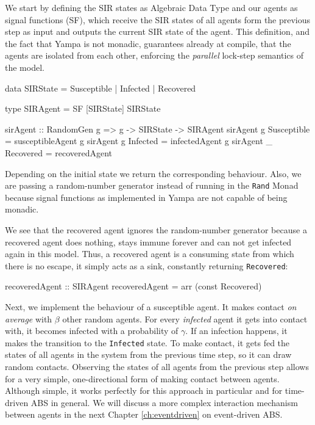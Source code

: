 We start by defining the SIR states as Algebraic Data Type and our agents as signal functions (SF), which receive the SIR states of all agents form the previous step as input and outputs the current SIR state of the agent. This definition, and the fact that Yampa is not monadic, guarantees already at compile, that the agents are isolated from each other, enforcing the \textit{parallel} lock-step semantics of the model.

\begin{HaskellCode}
data SIRState = Susceptible | Infected | Recovered

type SIRAgent = SF [SIRState] SIRState 

sirAgent :: RandomGen g => g -> SIRState -> SIRAgent
sirAgent g Susceptible = susceptibleAgent g
sirAgent g Infected    = infectedAgent g
sirAgent _ Recovered   = recoveredAgent
\end{HaskellCode}

Depending on the initial state we return the corresponding behaviour. Also, we are passing a random-number generator instead of running in the \texttt{Rand} Monad because signal functions as implemented in Yampa are not capable of being monadic. 

We see that the recovered agent ignores the random-number generator because a recovered agent does nothing, stays immune forever and can not get infected again in this model. Thus, a recovered agent is a consuming state from which there is no escape, it simply acts as a sink, constantly returning \texttt{Recovered}:

\begin{HaskellCode}
recoveredAgent :: SIRAgent
recoveredAgent = arr (const Recovered)
\end{HaskellCode}

Next, we implement the behaviour of a susceptible agent. It makes contact \textit{on average} with $\beta$ other random agents. For every \textit{infected} agent it gets into contact with, it becomes infected with a probability of $\gamma$. If an infection happens, it makes the transition to the \texttt{Infected} state. To make contact, it gets fed the states of all agents in the system from the previous time step, so it can draw random contacts. Observing the states of all agents from the previous step allows for a very simple, one-directional form of making contact between agents. Although simple, it works perfectly for this approach in particular and for time-driven ABS in general. We will discuss a more complex interaction mechanism between agents in the next Chapter \ref{ch:eventdriven} on event-driven ABS.

